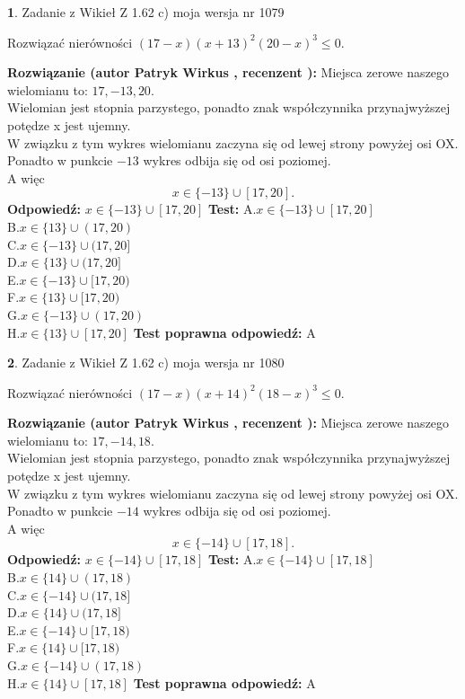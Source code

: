 \documentclass[12pt, a4paper]{article}
\theoremstyle{definition} %
\newtheorem{zad}{}
\newcommand{\zadStart}[1]{\begin{zad}#1\newline}
\newcommand{\zadStop}{\end{zad}}
\newcommand{\rozwStart}[2]{\noindent \textbf{Rozwiązanie (autor #1 , recenzent #2): }\newline}
\newcommand{\rozwStop}{\newline}
\newcommand{\odpStart}{\noindent \textbf{Odpowiedź:}\newline}
\newcommand{\odpStop}{\newline}
\newcommand{\testStart}{\noindent \textbf{Test:}\newline}
\newcommand{\testStop}{\newline}
\newcommand{\kluczStart}{\noindent \textbf{Test poprawna odpowiedź:}\newline}
\newcommand{\kluczStop}{\newline}
\begin{document}
\zadStart{Zadanie z Wikieł Z 1.62 c) moja wersja nr 1079}

Rozwiązać nierówności $(17-x)(x+13)^{2}(20-x)^{3}\le0$.
\zadStop
\rozwStart{Patryk Wirkus}{}
Miejsca zerowe naszego wielomianu to: $17, -13, 20$.\\
Wielomian jest stopnia parzystego, ponadto znak współczynnika przy\linebreak najwyższej potędze x jest ujemny.\\ W związku z tym wykres wielomianu zaczyna się od lewej strony powyżej osi OX.\\
Ponadto w punkcie $-13$ wykres odbija się od osi poziomej.\\
A więc $$x \in \{-13\} \cup [17,20].$$
\rozwStop
\odpStart
$x \in \{-13\} \cup [17,20]$
\odpStop
\testStart
A.$x \in \{-13\} \cup [17,20]$\\
B.$x \in \{13\} \cup (17,20)$\\
C.$x \in \{-13\} \cup (17,20]$\\
D.$x \in \{13\} \cup (17,20]$\\
E.$x \in \{-13\} \cup [17,20)$\\
F.$x \in \{13\} \cup [17,20)$\\
G.$x \in \{-13\} \cup (17,20)$\\
H.$x \in \{13\} \cup [17,20]$
\testStop
\kluczStart
A
\kluczStop



\zadStart{Zadanie z Wikieł Z 1.62 c) moja wersja nr 1080}

Rozwiązać nierówności $(17-x)(x+14)^{2}(18-x)^{3}\le0$.
\zadStop
\rozwStart{Patryk Wirkus}{}
Miejsca zerowe naszego wielomianu to: $17, -14, 18$.\\
Wielomian jest stopnia parzystego, ponadto znak współczynnika przy\linebreak najwyższej potędze x jest ujemny.\\ W związku z tym wykres wielomianu zaczyna się od lewej strony powyżej osi OX.\\
Ponadto w punkcie $-14$ wykres odbija się od osi poziomej.\\
A więc $$x \in \{-14\} \cup [17,18].$$
\rozwStop
\odpStart
$x \in \{-14\} \cup [17,18]$
\odpStop
\testStart
A.$x \in \{-14\} \cup [17,18]$\\
B.$x \in \{14\} \cup (17,18)$\\
C.$x \in \{-14\} \cup (17,18]$\\
D.$x \in \{14\} \cup (17,18]$\\
E.$x \in \{-14\} \cup [17,18)$\\
F.$x \in \{14\} \cup [17,18)$\\
G.$x \in \{-14\} \cup (17,18)$\\
H.$x \in \{14\} \cup [17,18]$
\testStop
\kluczStart
A
\kluczStop
\end{document}
